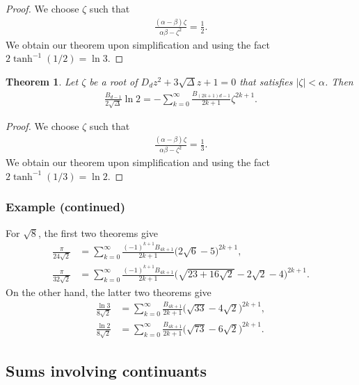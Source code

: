 \documentclass[12pt]{article}
\theoremstyle{plain}
\newtheorem{theorem}{Theorem}
\theoremstyle{definition}
\theoremstyle{remark}
\begin{document}
\begin{proof} We choose $ \zeta $ such that 
\begin{align*}
	\frac{(\alpha - \beta) \zeta}{\alpha \beta - \zeta^2} = \frac{1}{2}.
\end{align*}
We obtain our theorem upon simplification and using the fact $ 2\tanh^{-1} (1/2) = \ln 3 $.
\end{proof}

\begin{theorem} Let $ \zeta $ be a root of $ D_d z^2 + 3 \sqrt{\Delta} z + 1 = 0 $ that satisfies $ |\zeta| < \alpha $. Then
\begin{align*}
	\frac{B_{d - 1}}{2 \sqrt{\Delta}} \ln 2 = -\sum_{k = 0}^\infty \frac{B_{(2k + 1)d - 1}}{2k + 1} \zeta^{2k + 1}.
\end{align*}
\end{theorem}

\begin{proof} We choose $ \zeta $ such that 
\begin{align*}
	\frac{(\alpha - \beta) \zeta}{\alpha \beta - \zeta^2} = \frac{1}{3}.
\end{align*}
We obtain our theorem upon simplification and using the fact $ 2\tanh^{-1} (1/3) = \ln 2 $.
\end{proof}

\subsubsection{Example (continued)}

For $ \sqrt{8} $, the first two theorems give
\begin{align*}
	\frac{\pi}{24 \sqrt{2}} &= \sum_{k = 0}^\infty \frac{(-1)^{k + 1} B_{4k + 1}}{2k + 1} \bigg( 2\sqrt{6} - 5 \bigg)^{2k + 1}, \\
	\frac{\pi}{32 \sqrt{2}} &= \sum_{k = 0}^\infty \frac{(-1)^{k + 1} B_{4k + 1}}{2k + 1} \bigg( \sqrt{23 + 16\sqrt{2}} - 2\sqrt{2} - 4 \bigg)^{2k + 1}.
\end{align*}
On the other hand, the latter two theorems give
\begin{align*}
	\frac{\ln 3}{8 \sqrt{2}} &= \sum_{k = 0}^\infty \frac{B_{4k + 1}}{2k + 1} \bigg( \sqrt{33} - 4\sqrt{2} \bigg)^{2k + 1}, \\
	\frac{\ln 2}{8 \sqrt{2}} &= \sum_{k = 0}^\infty \frac{B_{4k + 1}}{2k + 1} \bigg( \sqrt{73} - 6\sqrt{2} \bigg)^{2k + 1}.
\end{align*}

\subsection{Sums involving continuants}
\end{document}
